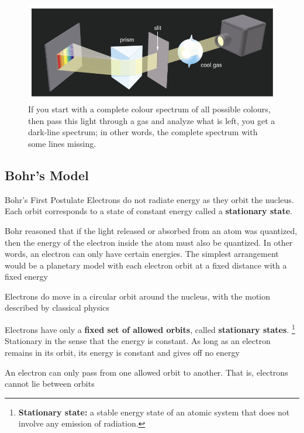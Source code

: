 \begin{figure}[ht!]
    \centering
    \includegraphics[width=0.9 \textwidth]{../figures/dark-line-spectrum.png}
    \caption{If you start with a complete colour spectrum of all possible colours, then pass this
            light through a gas and analyze what is left, you get a dark-line spectrum; in other words,
            the complete spectrum with some lines missing.}
    \label{fig:dark-line-spectrum}
\end{figure}

\subsection{Bohr's Model}
\begin{definition}{Bohr's First Postulate}
    Electrons do not radiate energy as they orbit the nucleus. Each orbit corresponds to a state
    of constant energy called a \textbf{stationary state}.
\end{definition}

\begin{bulleted-list}
    \item Bohr reasoned that if the light released or absorbed from an atom was quantized, then the
        energy of the electron inside the atom must also be quantized. In other words, an electron
        can only have certain energies. The simplest arrangement would be a planetary model with
        each electron orbit at a fixed distance with a fixed energy
    \item Electrons do move in a circular orbit around the nucleus, with the motion described
        by classical physics
    \item Electrons have only a \textbf{fixed set of allowed orbits}, called \textbf{stationary states}.
        \footnote{
            \textbf{Stationary state:} a stable energy state of an atomic system that does not
            involve any emission of radiation.
        }
        Stationary in the sense that the energy is constant.
        As long as an electron remains in its orbit, its energy is constant and gives off no energy
    \item An electron can only pass from one allowed orbit to another. That is, electrons cannot
        lie between orbits
\end{bulleted-list}

